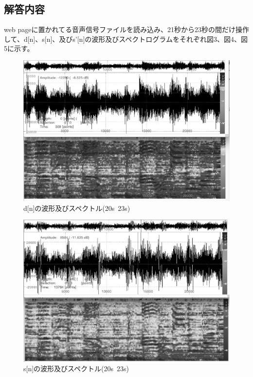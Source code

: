 \documentclass[a4j,12]{jarticle}
\begin{document}
       \subsection{解答内容}
       web pageに置かれてる音声信号ファイルを読み込み、21秒から23秒の間だけ操作して、d[n]、s[n]、及びs'[n]の波形及びスペクトログラムをそれぞれ図3、図4、図5に示す。
       \begin{figure}[htpb]
         \begin{center}
           \includegraphics[width=15cm]{d.eps}%
           \caption{d[n]の波形及びスペクトル(20s~23s)}
           \label{micon}
         \end{center}
       \end{figure}
       \begin{figure}[htpb]
         \begin{center}
           \includegraphics[width=15cm]{s.eps}%
           \caption{s[n]の波形及びスペクトル(20s~23s)}
           \label{micon}
         \end{center}
       \end{figure}
\end{document}
